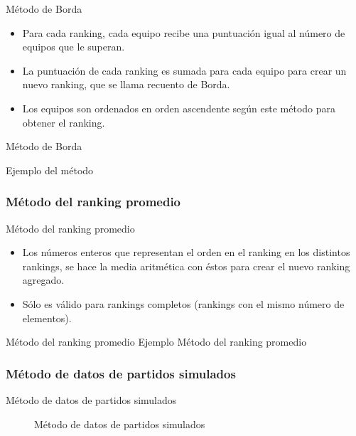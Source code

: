 \documentclass[11pt]{beamer}
\begin{document}
	\begin{frame}{Método de Borda}
		
		\begin{itemize}
			\item Para cada ranking, cada equipo recibe una puntuación igual al número de equipos que le superan.
			
			\item La puntuación de cada ranking es sumada para cada equipo para crear un nuevo ranking, que se llama recuento de Borda.
			
			\item Los equipos son ordenados en orden ascendente según este método para obtener el ranking.
		\end{itemize}
		
	\end{frame}
	
	\begin{frame}{Método de Borda}
		
		Ejemplo del método
		
	\end{frame}
	
	\subsubsection{Método del ranking promedio}
	
	\begin{frame}{Método del ranking promedio}
		\begin{itemize}
			\item Los números enteros que representan el orden en el ranking en los distintos rankings, se hace la media aritmética con éstos para crear el nuevo ranking agregado.
			
			\item Sólo es válido para rankings completos (rankings con el mismo número de elementos).
		\end{itemize}
	\end{frame}
	
	\begin{frame}{Método del ranking promedio}
		Ejemplo	Método del ranking promedio
	\end{frame}
	
	\subsubsection{Método de datos de partidos simulados}
	
	\begin{frame}{Método de datos de partidos simulados}
		\begin{figure}
			\centering
			\resizebox{.6\linewidth}{!}{\partidossimulados}
			
			\caption{Método de datos de partidos simulados}
			\label{fig:partidos_simulados}
		\end{figure}
	\end{frame}
	
\end{document}
